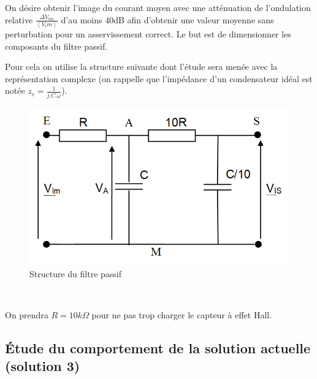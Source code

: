 On désire obtenir l'image du courant moyen avec une atténuation de l'ondulation relative $\frac{\Delta V_{im}}{\left\langle V_im \right\rangle}$ d'au moins 40dB afin d'obtenir une valeur moyenne sans perturbation pour un asservissement correct. Le but est de dimensionner les composants du filtre passif.

Pour cela on utilise la structure suivante dont l'étude sera menée avec la représentation complexe (on rappelle que l'impédance d'un condensateur idéal est notée $z_c=\frac{1}{j.C.\omega}$).
 
\begin{figure}[!h]
\begin{center}
	\includegraphics[width=0.6\linewidth]{img/fig18}
\end{center}
	\caption{Structure du filtre passif}
	\label{fig18}
\end{figure}





~\

On prendra $R=10k\Omega$ pour ne pas trop charger le capteur à effet Hall.


\subsection{Étude du comportement de la solution actuelle (solution 3)}

